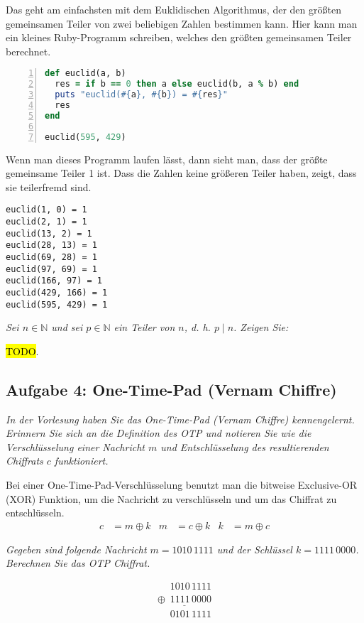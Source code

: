 \documentclass[
  ngerman,
  DIV=12
]{scrartcl}
\begin{document}
\medskip\noindent
Das geht am einfachsten mit dem Euklidischen Algorithmus, der den größten gemeinsamen Teiler von zwei beliebigen Zahlen bestimmen kann. Hier kann man ein kleines Ruby-Programm schreiben, welches den größten gemeinsamen Teiler berechnet.
\begin{lstlisting}[language=ruby,numbers=left]
def euclid(a, b)
  res = if b == 0 then a else euclid(b, a % b) end
  puts "euclid(#{a}, #{b}) = #{res}"
  res
end

euclid(595, 429)  
\end{lstlisting}
Wenn man dieses Programm laufen lässt, dann sieht man, dass der größte gemeinsame Teiler 1 ist. Dass die Zahlen keine größeren Teiler haben, zeigt, dass sie teilerfremd sind.
\begin{lstlisting}
euclid(1, 0) = 1
euclid(2, 1) = 1
euclid(13, 2) = 1
euclid(28, 13) = 1
euclid(69, 28) = 1
euclid(97, 69) = 1
euclid(166, 97) = 1
euclid(429, 166) = 1
euclid(595, 429) = 1  
\end{lstlisting}

\bigskip\noindent
\emph{Sei $n \in \mathbb{N}$ und sei $p \in \mathbb{N}$ ein Teiler von $n$, d. h. $p \mid n$. Zeigen Sie:}

\medskip\noindent
\hl{TODO}.

\subsection*{Aufgabe 4: One-Time-Pad (Vernam Chiffre)}

\emph{In der Vorlesung haben Sie das One-Time-Pad (Vernam Chiffre) kennengelernt. Erinnern Sie sich an die Definition des OTP und notieren Sie wie die Verschlüsselung einer Nachricht $m$ und Entschlüsselung des resultierenden Chiffrats $c$ funktioniert.}

\medskip\noindent
Bei einer One-Time-Pad-Verschlüsselung benutzt man die bitweise Exclusive-OR (XOR) Funktion, um die Nachricht zu verschlüsseln und um das Chiffrat zu entschlüsseln. 
\begin{align*}
  c &= m \oplus k & m &= c \oplus k & k &= m \oplus c
\end{align*}

\bigskip\noindent
\emph{Gegeben sind folgende Nachricht $m = 1010\,1111$ und der Schlüssel $k = 1111\,0000$. Berechnen Sie das OTP Chiffrat.}

\begin{equation*}
\begin{array}{c}
\phantom{\oplus9}1010\,1111\\
\underline{\oplus\phantom{9}1111\,0000}\\
\phantom{\oplus9}0101\,1111\\
\end{array}
\end{equation*}
\end{document}
